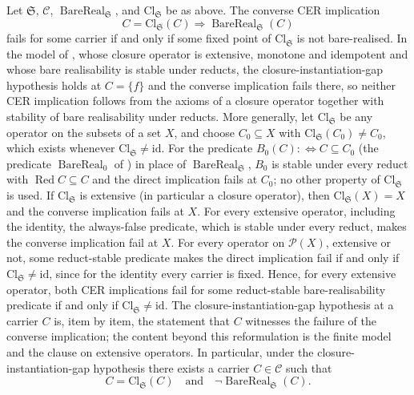 \begin{theorem}\label{thm:CER-converse-no-go}
Let \(\mathfrak S\), \(\mathcal C\),
\(\operatorname{BareReal}_{\mathfrak S}\), and
\(\mathrm{Cl}_{\mathfrak S}\) be as above.  The converse CER implication
\[
  C=\mathrm{Cl}_{\mathfrak S}(C)
  \Longrightarrow
  \operatorname{BareReal}_{\mathfrak S}(C)
\]
fails for some carrier if and only if some fixed point of
\(\mathrm{Cl}_{\mathfrak S}\) is not bare-realised. In the model of
, whose closure operator is extensive, monotone and
idempotent and whose bare realisability is stable under reducts, the
closure-instantiation-gap hypothesis holds at \(C=\{f\}\) and the converse
implication fails there, so neither CER implication follows from the axioms of
a closure operator together with stability of bare realisability under
reducts. More generally, let \(\mathrm{Cl}_{\mathfrak S}\) be any
operator on the subsets of a set \(X\), and choose
\(C_0\subseteq X\) with \(\mathrm{Cl}_{\mathfrak S}(C_0)\ne C_0\), which exists
whenever \(\mathrm{Cl}_{\mathfrak S}\ne\mathrm{id}\). For
the predicate \(B_0(C):\Leftrightarrow C\subseteq C_0\) (the predicate \(\operatorname{BareReal}_0\) of ) in place of
\(\operatorname{BareReal}_{\mathfrak S}\), \(B_0\) is stable under every reduct with
\(\operatorname{Red}C\subseteq C\) and the direct implication fails at \(C_0\); no other property of \(\mathrm{Cl}_{\mathfrak S}\) is used. If \(\mathrm{Cl}_{\mathfrak S}\) is extensive (in particular a closure operator), then \(\mathrm{Cl}_{\mathfrak S}(X)=X\) and the converse implication fails at \(X\). For every extensive operator,
including the identity, the always-false predicate, which is stable under
every reduct, makes the converse implication fail at \(X\). For every operator on \(\mathcal P(X)\), extensive or not, some reduct-stable predicate makes the direct implication fail if
and only if \(\mathrm{Cl}_{\mathfrak S}\ne\mathrm{id}\), since for the identity every
carrier is fixed. Hence, for every extensive operator, both CER implications fail for some reduct-stable
bare-realisability predicate if and only if \(\mathrm{Cl}_{\mathfrak S}\ne\mathrm{id}\).
The closure-instantiation-gap hypothesis at a carrier \(C\) is, item by item,
the statement that \(C\) witnesses the failure of the converse implication;
the content beyond this reformulation is the finite model and the clause on
extensive operators. In particular, under the closure-instantiation-gap
hypothesis there exists a carrier \(C\in\mathcal C\) such that
\[
  C=\mathrm{Cl}_{\mathfrak S}(C)
  \quad\text{and}\quad
  \neg\operatorname{BareReal}_{\mathfrak S}(C).
\]
\end{theorem}
